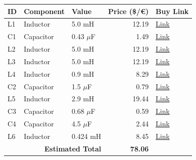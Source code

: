 \begin{table}[H]
    \centering
    \renewcommand{\arraystretch}{1.5}
    \begin{tabular}{@{}lllrl@{}}
        \toprule
        \textbf{ID} & \textbf{Component} & \textbf{Value} & \textbf{Price (\$/€)} & \textbf{Buy Link} \\
        \midrule
        L1 & Inductor & 5.0 mH & 12.19 & \href{https://www.parts-express.com/Dayton-Audio-IC185-5.0mH-18-AWG-Laminated-Iron-Core-Inductor-257-668}{Link} \\
        C1 & Capacitor & 0.43 $\mu$F & 1.49 & \href{https://www.soundimports.eu/en/jantzen-audio-001-0218.html}{Link} \\
        L2 & Inductor & 5.0 mH & 12.19 & \href{https://www.parts-express.com/Dayton-Audio-IC185-5.0mH-18-AWG-Laminated-Iron-Core-Inductor-257-668}{Link} \\
        L3 & Inductor & 5.0 mH & 12.19 & \href{https://www.parts-express.com/Dayton-Audio-IC185-5.0mH-18-AWG-Laminated-Iron-Core-Inductor-257-668}{Link} \\
        L4 & Inductor & 0.9 mH & 8.29 & \href{https://www.parts-express.com/Dayton-Audio-LW18-90-0.90mH-18-AWG-Perfect-Layer-Inductor-257-824}{Link} \\
        C2 & Capacitor & 1.5 $\mu$F & 0.79 & \href{https://www.parts-express.com/Solen-1.5uF-400V-Polypropylene-Capacitor-027-528}{Link} \\
        L5 & Inductor & 2.9 mH & 19.44 & \href{https://www.soundimports.eu/en/jantzen-audio-000-0990.html}{Link} \\
        C3 & Capacitor & 0.68 $\mu$F & 0.59 & \href{https://www.parts-express.com/Dayton-Audio-DMPC-0.68-0.68uF-250V-Polypropylene-Capacitor-027-408}{Link} \\
        C4 & Capacitor & 4.5 $\mu$F & 2.44 & \href{https://www.soundimports.eu/en/jantzen-audio-001-0249.html}{Link} \\
        L6 & Inductor & 0.424 mH & 8.45 & \href{https://www.soundimports.eu/en/jantzen-audio-000-0911.html}{Link} \\
        \midrule
        \multicolumn{3}{r}{\textbf{Estimated Total}} & \textbf{78.06} & \\
        \bottomrule
    \end{tabular}
\end{table}
